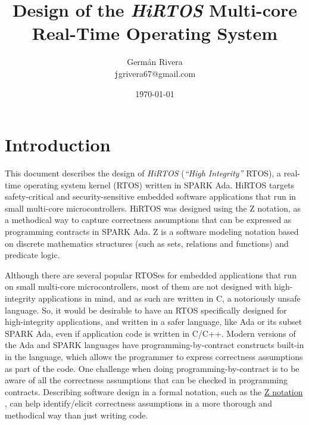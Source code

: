 \documentclass[11pt,letterpaper,twoside,openany]{book}
\begin{document}
\title{Design of the \emph{HiRTOS} Multi-core \\
       Real-Time Operating System}
\author{Germ\'an Rivera \\
        \texttt jgrivera67@gmail.com}
\date{\today}
\maketitle

\frontmatter
\tableofcontents

\mainmatter
\raggedbottom
\pagestyle{myheadings}

\chapter{Introduction}

This document describes the design of \emph{HiRTOS} (\emph{``High Integrity''} RTOS),
a real-time operating system kernel (RTOS) written in SPARK Ada. HiRTOS targets
safety-critical and security-sensitive embedded software applications that run
in small multi-core microcontrollers. HiRTOS was designed using the Z notation,
as a methodical way to capture correctness assumptions that can be expressed
as programming contracts in SPARK Ada. Z is a software modeling notation based
on discrete mathematics structures (such as sets, relations and functions)
and predicate logic.

Although there are several popular RTOSes for embedded applications that run on small
multi-core microcontrollers, most of them are not designed with high-integrity applications
in mind, and as such are written in C, a notoriously unsafe language. So, it would be desirable
to have an RTOS specifically designed for high-integrity applications, and written in a safer
language, like Ada or its subset SPARK Ada, even if application code is written in C/C++.
Modern versions of the Ada and SPARK languages have programming-by-contract constructs built-in
in the language, which allows the programmer to express correctness assumptions as part of the
code. One challenge when doing programming-by-contract is to be aware of all the correctness
assumptions that can be checked in programming contracts. Describing software design in a formal
notation, such as the \href{http://en.wikipedia.org/wiki/Z_notation}{Z notation} \cite{Zref, Zrm, WayofZ},
can help identify/elicit correctness assumptions in a more thorough and methodical way than just
writing code.
\end{document}
